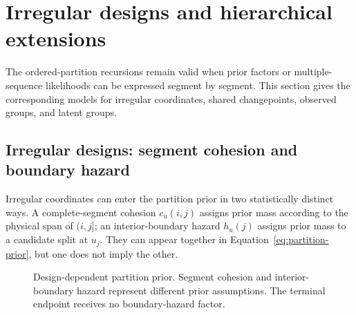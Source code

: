 \section{Irregular designs and hierarchical extensions}
\label{sec:extensions}

The ordered-partition recursions remain valid when prior factors or multiple-sequence likelihoods can be expressed segment by segment. This section gives the corresponding models for irregular coordinates, shared changepoints, observed groups, and latent groups.

\subsection{Irregular designs: segment cohesion and boundary hazard}
Irregular coordinates can enter the partition prior in two statistically distinct ways. A complete-segment cohesion $c_u(i,j)$ assigns prior mass according to the physical span of $(i,j]$; an interior-boundary hazard $h_u(j)$ assigns prior mass to a candidate split at $u_j$. They can appear together in Equation~\eqref{eq:partition-prior}, but one does not imply the other.

\begin{figure}[!htbp]
  \centering
  \resizebox{0.96\columnwidth}{!}{}
  \caption{Design-dependent partition prior. Segment cohesion and interior-boundary hazard represent different prior assumptions. The terminal endpoint receives no boundary-hazard factor.}
  \label{fig:cohesion-hazard-paper}
\end{figure}

